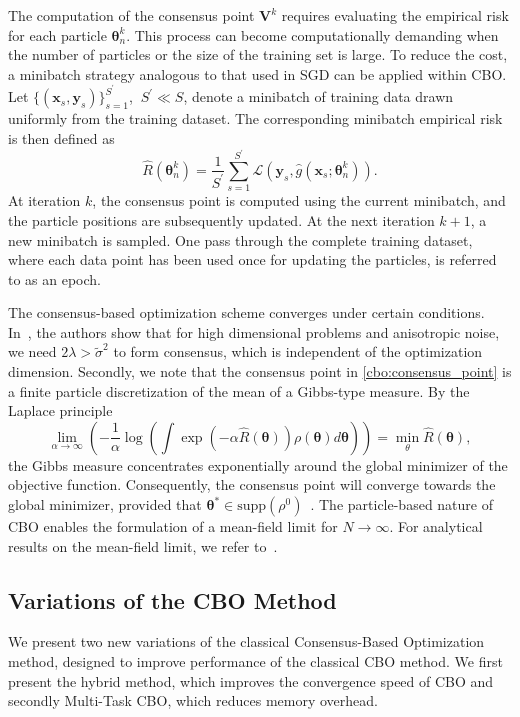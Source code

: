 \documentclass[a4paper, 11pt]{article}
\newcommand{\btheta}{\bm{\theta}}
\theoremstyle{plain} %
\begin{document}
	The computation of the consensus point $ \bm{V}^{k} $ requires evaluating the empirical risk for each particle $ \btheta_{n}^{k} $. This process can become computationally demanding when the number of particles or the size of the training set is large. To reduce the cost, a minibatch strategy analogous to that used in SGD can be applied within CBO. Let $ \{(\bm{x}_{s}, \bm{y}_{s}) \}_{s=1}^{S^\prime} $, $~ S^\prime \ll S  $, denote a minibatch of training data drawn uniformly from the training dataset. The corresponding minibatch empirical risk is then defined as
	\begin{equation}
		\hat{R}(\btheta_{n}^{k}) = \frac{1}{S^\prime} \sum_{s=1}^{S^\prime}\mathcal{L}\left( \bm{y}_{s},\hat{g}(\bm{x}_{s};\btheta_{n}^{k}) \right).
	\end{equation}
	At iteration $ k $, the consensus point is computed using the current minibatch, and the particle positions are subsequently updated. At the next iteration $ k+1 $, a new minibatch is sampled. One pass through the complete training dataset, where each data point has been used once for updating the particles, is referred to as an epoch.

	The consensus-based optimization scheme converges under certain conditions. In~\cite{carrillo2021}, the authors show that for high dimensional problems and anisotropic noise, we need $ 2\lambda > \tilde{\sigma}^2 $ to form consensus, which is independent of the optimization dimension. Secondly, we note that the consensus point in \eqref{cbo:consensus_point} is a finite particle discretization of the mean of a Gibbs-type measure. By the Laplace principle~\cite{dembo2010} 
	\begin{equation}
		\lim_{\alpha \to \infty} \left( - \frac{1}{\alpha} \log \left( \int \exp \left( -\alpha \hat{R}(\bm{\theta}) \right)\rho \left(\bm{\theta}\right) d\bm{\theta} \right) \right) = \min_{\theta} \hat{R}(\bm{\theta}),
	\end{equation}
	the Gibbs measure concentrates exponentially around the global minimizer of the objective function. Consequently, the consensus point will converge towards the global minimizer, provided that $ \bm{\theta}^{*} \in \text{supp}\left(\rho^0\right)$~\cite{carrillo2018}. The particle-based nature of CBO enables the formulation of a mean-field limit for $ N \to  \infty$. For analytical results on the mean-field limit, we refer to~\cite{carrillo2018,gerber2025,huang2022,kossMeanFieldLimit2024a, fornasier2022, gerber2026uniform}.

	\subsection{Variations of the CBO Method}
	We present two new variations of the classical Consensus-Based Optimization method, designed to improve performance of the classical CBO method. We first present the hybrid method, which improves the convergence speed of CBO and secondly Multi-Task CBO, which reduces memory overhead.
\end{document}
